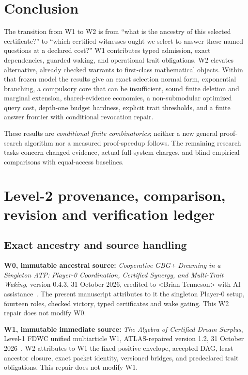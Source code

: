 \documentclass[10pt,letterpaper]{article}
\theoremstyle{definition}
\theoremstyle{remark}
\newcommand{\authorname}{\textless{}Brian Tenneson\textgreater{}}
\begin{document}
\section{Conclusion}\label{gl-first-W2-s11}
The transition from W1 to W2 is from ``what is the ancestry of this selected certificate?'' to ``which certified witnesses ought we select to answer these named questions at a declared cost?'' W1 contributes typed admission, exact dependencies, guarded waking, and operational trait obligations. W2 elevates alternative, already checked warrants to first-class mathematical objects. Within that frozen model the results give an exact selection normal form, exponential branching, a compulsory core that can be insufficient, sound finite deletion and marginal extension, shared-evidence economies, a non-submodular optimized query cost, depth-one budget hardness, explicit trait thresholds, and a finite answer frontier with conditional revocation repair.

These results are \emph{conditional finite combinatorics}; neither a new general proof-search algorithm nor a measured proof-speedup follows. The remaining research tasks concern changed evidence, actual full-system charges, and blind empirical comparisons with equal-access baselines.

\appendix
\section{Level-2 provenance, comparison, revision and verification ledger}\label{gl-first-W2-s12}
\subsection{Exact ancestry and source handling}
\textbf{W0, immutable ancestral source:} \emph{Cooperative GBG+ Dreaming in a Singleton ATP: Player-0 Coordination, Certified Synergy, and Multi-Trait Waking}, version 0.4.3, 31 October 2026, credited to \authorname{} with AI assistance~\cite{W0}. The present manuscript attributes to it the singleton Player-0 setup, fourteen roles, checked victory, typed certificates and wake gating. This W2 repair does not modify W0.

\textbf{W1, immutable immediate source:} \emph{The Algebra of Certified Dream Surplus}, Level-1 FDWC unified multiarticle W1, ATLAS-repaired version 1.2, 31 October 2026~\cite{W1}. W2 attributes to W1 the fixed positive envelope, accepted DAG, least ancestor closure, exact packet identity, versioned bridges, and predeclared trait obligations. This repair does not modify W1.
\end{document}
